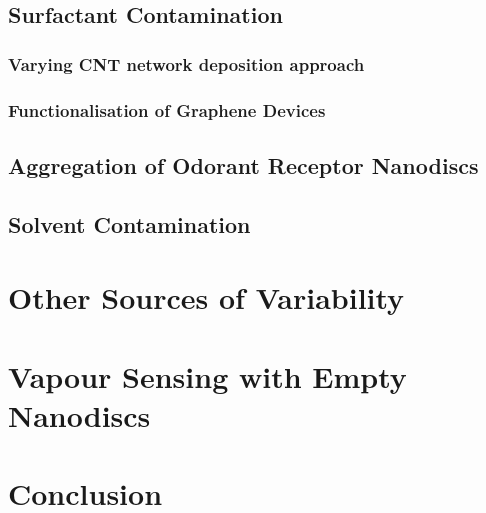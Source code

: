 \documentclass[
  a4paper,
]{scrbook}
\begin{document}
\hypertarget{sec-cnt-deposition-effects}{%
\subsection{Surfactant Contamination}\label{sec-cnt-deposition-effects}}

\hypertarget{varying-cnt-network-deposition-approach}{%
\subsubsection*{Varying CNT network deposition
approach}\label{varying-cnt-network-deposition-approach}}

\hypertarget{functionalisation-of-graphene-devices}{%
\subsubsection*{Functionalisation of Graphene
Devices}\label{functionalisation-of-graphene-devices}}

\hypertarget{aggregation-of-odorant-receptor-nanodiscs}{%
\subsection{Aggregation of Odorant Receptor
Nanodiscs}\label{aggregation-of-odorant-receptor-nanodiscs}}

\hypertarget{solvent-contamination}{%
\subsection{Solvent Contamination}\label{solvent-contamination}}

\hypertarget{other-sources-of-variability}{%
\section{Other Sources of
Variability}\label{other-sources-of-variability}}

\hypertarget{vapour-sensing-with-empty-nanodiscs}{%
\section{Vapour Sensing with Empty
Nanodiscs}\label{vapour-sensing-with-empty-nanodiscs}}

\hypertarget{conclusion-1}{%
\section{Conclusion}\label{conclusion-1}}
\end{document}
